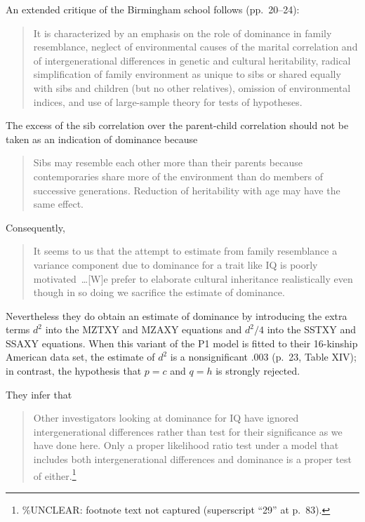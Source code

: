 ﻿\documentclass[12pt]{article}
\begin{document}
An extended critique of the Birmingham school follows (pp.\ 20--24):

\begin{quote}
It is characterized by an emphasis on the role of dominance in family resemblance, neglect of environmental causes of the marital correlation and of intergenerational differences in genetic and cultural heritability, radical simplification of family environment as unique to sibs or shared equally with sibs and children (but no other relatives), omission of environmental indices, and use of large-sample theory for tests of hypotheses.
\end{quote}

The excess of the sib correlation over the parent-child correlation should not be taken as an indication of dominance because

\begin{quote}
Sibs may resemble each other more than their parents because contemporaries share more of the environment than do members of successive generations. Reduction of heritability with age may have the same effect.
\end{quote}

Consequently,

\begin{quote}
It seems to us that the attempt to estimate from family resemblance a variance component due to dominance for a trait like IQ is poorly motivated~\ldots [W]e prefer to elaborate cultural inheritance realistically even though in so doing we sacrifice the estimate of dominance.
\end{quote}

Nevertheless they do obtain an estimate of dominance by introducing the extra terms $d^2$ into the MZTXY and MZAXY equations and $d^2/4$ into the SSTXY and SSAXY equations. When this variant of the P1 model is fitted to their 16-kinship American data set, the estimate of $d^2$ is a nonsignificant .003 (p.\ 23, Table XIV); in contrast, the hypothesis that $p=c$ and $q=h$ is strongly rejected.

They infer that

\begin{quote}
Other investigators looking at dominance for IQ have ignored intergenerational differences rather than test for their significance as we have done here. Only a proper likelihood ratio test under a model that includes both intergenerational differences and dominance is a proper test of either.\footnote{\%UNCLEAR: footnote text not captured (superscript ``29'' at p.\ 83).}
\end{quote}
\end{document}
